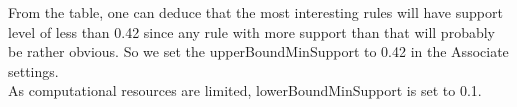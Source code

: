\noindent
From the table, one can deduce that the most interesting rules will have support level of less than 0.42 since any rule with more support than that will probably be rather obvious. So we set the upperBoundMinSupport to 0.42 in the Associate settings.\\
As computational resources are limited, lowerBoundMinSupport is set to 0.1.